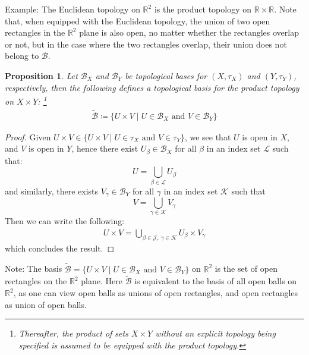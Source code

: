 \documentclass[11pt]{book}
\theoremstyle{break}
\theoremstyle{break}
\newtheorem{prop}[lem]{Proposition}
\newcommand{\R}{\mathbb{R}}
\newcommand{\that}[1]{\widetilde{#1}}
\newcommand{\note}{\color{red}Note: \color{black}}
\newcommand{\example}{\color{green}Example: \color{black}}
\begin{document}
\example The Euclidean topology on $\R^2$ is the product topology on $\R \times \R$. Note that, when equipped with the Euclidean topology, the union of two open rectangles in the $\R^2$ plane is also open, no matter whether the rectangles overlap or not, but in the case where the two rectangles overlap, their union does not belong to $\mathcal{B}$.


\begin{prop}
Let $\mathcal{B}_X$ and $\mathcal{B}_Y$ be topological bases for $(X,\tau_X)$ and $(Y,\tau_Y)$, respectively, then the following defines a topological basis for the product topology on $X \times Y$: \footnote{Thereafter, the product of sets $X \times Y$ without an explicit topology being specified is assumed to be equipped with the product topology.}
\begin{align*}
\that{\mathcal{B}}\coloneqq \{ U \times V \mid U \in \mathcal{B}_X \text{ and }V \in \mathcal{B}_Y\}
\end{align*}
\end{prop}
\begin{proof}
Given $U \times V \in \{ U \times V \mid U\in \tau_X \text{ and }V \in \tau_Y\}$, we see that $U$ is open in $X$, and $V$ is open in $Y$, hence there exist $U_\beta \in \mathcal{B}_X$ for all $\beta$ in an index set $\mathcal{L}$ such that: 
$$U = \bigcup_{\beta \in \mathcal{L}} U_\beta$$ 
and similarly, there exists $V_\gamma \in \mathcal{B}_Y$ for all $\gamma $ in an index set $\mathcal{K}$ such that $$V = \bigcup_{\gamma \in \mathcal{K}}V_\gamma$$ 
Then we can write the following:
\begin{align*}
U \times V = \bigcup_{\beta\in \mathcal{J},\ \gamma\in \mathcal{K}} U_\beta \times V_\gamma
\end{align*}
which concludes the result.
\end{proof}

\note The basis $\that{\mathcal{B}} = \{U\times V\mid U \in \mathcal{B}_X \text{ and }V\in \mathcal{B}_Y\}$ on $\R^2$ is the set of open rectangles on the $\R^2$ plane. Here $\that{\mathcal{B}}$ is equivalent to the basis of all open balls on $\R^2$, as one can view open balls as unions of open rectangles, and open rectangles as union of open balls. \\
\end{document}
